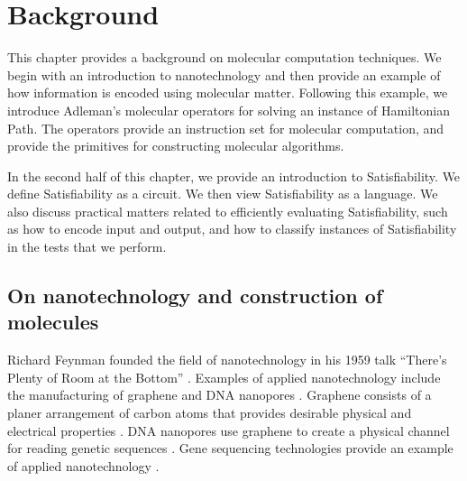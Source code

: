\chapter{Background}


This chapter provides a background on molecular computation techniques.  We begin with an introduction to nanotechnology and then provide an example of how information is encoded using molecular matter.  Following this example, we introduce Adleman's molecular operators for solving an instance of {\sc Hamiltonian Path}.  The operators provide an instruction set for molecular computation, and provide the primitives for constructing molecular algorithms.

In the second half of this chapter, we provide an introduction to {\sc Satisfiability}.  We define {\sc Satisfiability} as a circuit.  We then view {\sc Satisfiability} as a language.  We also discuss practical matters related to efficiently evaluating {\sc Satisfiability}, such as how to encode input and output, and how to classify instances of {\sc Satisfiability} in the tests that we perform.

\section{On nanotechnology and construction of molecules}

		
	Richard Feynman founded the field of nanotechnology in his 1959 talk ``There's Plenty of Room at the Bottom'' \cite{feynman1959}.  Examples of applied nanotechnology include the manufacturing of graphene \cite{Stankovich_Dikin_Dommett_Kohlhaas_Zimney_Stach_Piner_Nguyen_Ruoff_2006} and DNA nanopores \cite{dnaTransistorIBMpressrelease}. Graphene consists of a planer arrangement of carbon atoms that provides desirable physical and electrical properties \cite{Stankovich_Dikin_Dommett_Kohlhaas_Zimney_Stach_Piner_Nguyen_Ruoff_2006}.  DNA nanopores use graphene to create a physical channel for reading genetic sequences \cite{Garaj2010}.  Gene sequencing technologies provide an example of applied nanotechnology \cite{Garaj2010, ionTorrent, oxfordNanopore}.  					
		
		

